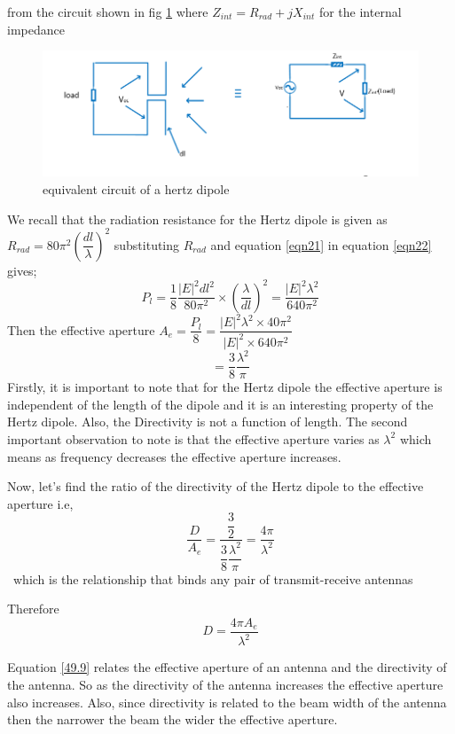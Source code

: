 from the circuit shown in fig \ref{fig6} where $Z_{int}=R_{rad}+jX_{int} $ for the internal impedance 
\begin{figure}[h]
\centering
\includegraphics[width=1\linewidth]{./graphics/fig52_6}
\caption{equivalent circuit of a hertz dipole}
\label{fig6}	
\end{figure}

We recall that the radiation resistance for the Hertz dipole is given as $R_{rad}=80\pi^{2}(\dfrac{dl}{\lambda})^{2}$ substituting $R_{rad}$ and equation \ref{eqn21} in equation \ref{eqn22} gives; 
$$	P_{l}=\dfrac{1}{8}\dfrac{|E|^{2}dl^{2}}{80\pi^{2}}\times\left(\dfrac{\lambda}{dl}\right)^{2}= \dfrac{|E|^{2}\lambda^{2}}{640\pi^{2}}$$
Then the effective aperture $A_{e}=\dfrac{P_{l}}{8}=\dfrac{|E|^{2}\lambda^{2}\times40\pi^{2}}{|E|^{2}\times640\pi^{2}}$
$$=\dfrac{3}{8}\dfrac{\lambda^{2}}{\pi}$$
Firstly, it is important to note that for the Hertz dipole the effective aperture is independent of the length of the dipole and it is an interesting property of the Hertz dipole. Also, the Directivity is not a function of length. The second important observation to note is that the effective aperture varies as $\lambda^{2}$ which means as frequency decreases the effective aperture increases.

Now, let's find the ratio  of the directivity of the Hertz dipole to the effective aperture i.e,
$$\dfrac{D}{A_{e}}=\dfrac{\dfrac{3}{2}}{\dfrac{3}{8}\dfrac{\lambda^{2}}{\pi}}= \dfrac{4\pi}{\lambda^{2}}$$ \ which is the relationship that binds any pair of transmit-receive antennas

Therefore
\begin{equation}
\label{49.9}
D=\dfrac{4\pi A_{e}}{\lambda^{2}}
\end{equation}

Equation \ref{49.9} relates the effective aperture of an antenna and the directivity of the antenna. So as the directivity of the antenna increases the effective aperture also increases. Also, since directivity is related to the beam width of the antenna then the narrower the beam the wider the effective aperture.

